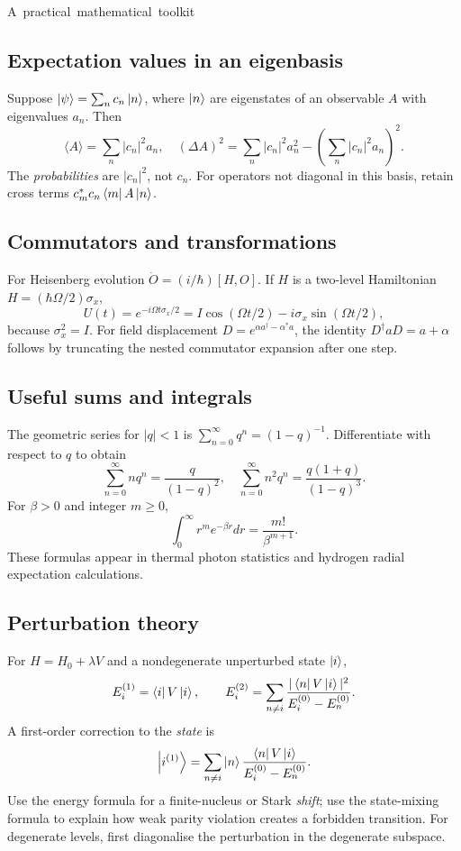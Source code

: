 \unit{A practical mathematical toolkit}
\subsection{Expectation values in an eigenbasis}
Suppose \(\left\lvert \psi\right\rangle=\sum_nc_n\left\lvert n\right\rangle\),
where \(\left\lvert n\right\rangle\) are eigenstates of an
observable \(A\) with eigenvalues \(a_n\).
Then
\[
\langle A\rangle=\sum_n|c_n|^2a_n,\quad
(\Delta A)^2=\sum_n|c_n|^2a_n^2
-\left(\sum_n|c_n|^2a_n\right)^2.
\]
The \emph{probabilities} are \(|c_n|^2\),
not \(c_n\). For operators not diagonal
in this basis, retain cross terms
\(c_m^*c_n\left\langle m\right\rvert A\left\lvert n\right\rangle\).

\subsection{Commutators and transformations}
For Heisenberg evolution
\(\dot O=(i/\hbar)[H,O]\).
If \(H\) is a two-level Hamiltonian
\(H=(\hbar\Omega/2)\sigma_x\),
\[
U(t)=e^{-i\Omega t\sigma_x/2}
=I\cos(\Omega t/2)
-i\sigma_x\sin(\Omega t/2),
\]
because \(\sigma_x^2=I\).
For field displacement
\(D=e^{\alpha a^\dagger-\alpha^*a}\),
the identity \(D^\dagger aD=a+\alpha\)
follows by truncating the nested
commutator expansion after one step.

\subsection{Useful sums and integrals}
The geometric series for \(|q|<1\) is
\(\sum_{n=0}^\infty q^n=(1-q)^{-1}\).
Differentiate with respect to \(q\) to obtain
\[
\sum_{n=0}^\infty nq^n=\frac{q}{(1-q)^2},\quad
\sum_{n=0}^\infty n^2q^n
=\frac{q(1+q)}{(1-q)^3}.
\]
For \(\beta>0\) and integer \(m\ge0\),
\[
\boxed{\int_0^\infty r^me^{-\beta r}dr
=\frac{m!}{\beta^{m+1}}.}
\]
These formulas appear in thermal
photon statistics and hydrogen radial
expectation calculations.

\subsection{Perturbation theory}
For \(H=H_0+\lambda V\) and a
nondegenerate unperturbed state \(\left\lvert i\right\rangle\),
\[
E_i^{(1)}=\left\langle i\right\rvert V\left\lvert i\right\rangle,\qquad
E_i^{(2)}=
\sum_{n\ne i}\frac{|\left\langle n\right\rvert V\left\lvert i\right\rangle|^2}
{E_i^{(0)}-E_n^{(0)}}.
\]
A first-order correction to the
\emph{state} is
\[
\left\lvert i^{(1)}\right\rangle=
\sum_{n\ne i}\left\lvert n\right\rangle
\frac{\left\langle n\right\rvert V\left\lvert i\right\rangle}{E_i^{(0)}-E_n^{(0)}}.
\]
Use the energy formula for a
finite-nucleus or Stark \emph{shift};
use the state-mixing formula to
explain how weak parity violation
creates a forbidden transition.
For degenerate levels, first
diagonalise the perturbation in
the degenerate subspace.

